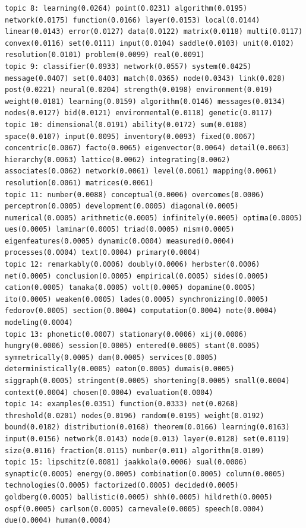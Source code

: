 \documentclass[10pt]{article}
\begin{document}
\begin{verbatim}
topic 8: learning(0.0264) point(0.0231) algorithm(0.0195) network(0.0175) function(0.0166) layer(0.0153) local(0.0144) linear(0.0143) error(0.0127) data(0.0122) matrix(0.0118) multi(0.0117) convex(0.0116) set(0.0111) input(0.0104) saddle(0.0103) unit(0.0102) resolution(0.0101) problem(0.0099) real(0.0091)
topic 9: classifier(0.0933) network(0.0557) system(0.0425) message(0.0407) set(0.0403) match(0.0365) node(0.0343) link(0.028) post(0.0221) neural(0.0204) strength(0.0198) environment(0.019) weight(0.0181) learning(0.0159) algorithm(0.0146) messages(0.0134) nodes(0.0127) bid(0.0121) environmental(0.0118) genetic(0.0117)
topic 10: dimensional(0.0191) ability(0.0172) sum(0.0108) space(0.0107) input(0.0095) inventory(0.0093) fixed(0.0067) concentric(0.0067) facto(0.0065) eigenvector(0.0064) detail(0.0063) hierarchy(0.0063) lattice(0.0062) integrating(0.0062) associates(0.0062) network(0.0061) level(0.0061) mapping(0.0061) resolution(0.0061) matrices(0.0061)
topic 11: number(0.0088) conceptual(0.0006) overcomes(0.0006) perceptron(0.0005) development(0.0005) diagonal(0.0005) numerical(0.0005) arithmetic(0.0005) infinitely(0.0005) optima(0.0005) ues(0.0005) laminar(0.0005) triad(0.0005) nism(0.0005) eigenfeatures(0.0005) dynamic(0.0004) measured(0.0004) processes(0.0004) text(0.0004) primary(0.0004)
topic 12: remarkably(0.0006) doubly(0.0006) herbster(0.0006) net(0.0005) conclusion(0.0005) empirical(0.0005) sides(0.0005) cation(0.0005) tanaka(0.0005) volt(0.0005) dopamine(0.0005) ito(0.0005) weaken(0.0005) lades(0.0005) synchronizing(0.0005) fedorov(0.0005) section(0.0004) computation(0.0004) note(0.0004) modeling(0.0004)
topic 13: phonetic(0.0007) stationary(0.0006) xij(0.0006) hungry(0.0006) session(0.0005) entered(0.0005) stant(0.0005) symmetrically(0.0005) dam(0.0005) services(0.0005) deterministically(0.0005) eaton(0.0005) dumais(0.0005) siggraph(0.0005) stringent(0.0005) shortening(0.0005) small(0.0004) context(0.0004) chosen(0.0004) evaluation(0.0004)
topic 14: examples(0.0351) function(0.0333) net(0.0268) threshold(0.0201) nodes(0.0196) random(0.0195) weight(0.0192) bound(0.0182) distribution(0.0168) theorem(0.0166) learning(0.0163) input(0.0156) network(0.0143) node(0.013) layer(0.0128) set(0.0119) size(0.0116) fraction(0.0115) number(0.011) algorithm(0.0109)
topic 15: lipschitz(0.0081) jaakkola(0.0006) sual(0.0006) synaptic(0.0005) energy(0.0005) combination(0.0005) column(0.0005) technologies(0.0005) factorized(0.0005) decided(0.0005) goldberg(0.0005) ballistic(0.0005) shh(0.0005) hildreth(0.0005) ospf(0.0005) carlson(0.0005) carnevale(0.0005) speech(0.0004) due(0.0004) human(0.0004)

\end{verbatim}
\end{document}
